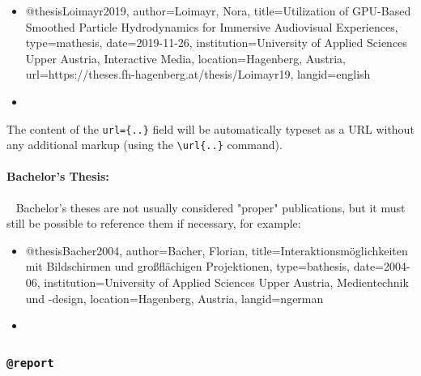 %
\begin{itemize}
\item[]
\begin{GenericCode}[numbers=none]
@thesis{Loimayr2019,
  author={Loimayr, Nora},
  title={Utilization of GPU-Based Smoothed Particle Hydrodynamics for Immersive Audiovisual Experiences},
  type={mathesis},
  date={2019-11-26},
  institution={University of Applied Sciences Upper Austria, Interactive Media},
  location={Hagenberg, Austria},
  url={https://theses.fh-hagenberg.at/thesis/Loimayr19},
  langid={english}
}
\end{GenericCode}
\item[\cite{Loimayr2019}] 
\end{itemize}
%
The content of the \verb!url={..}! field will be automatically typeset as a URL
without any additional markup (using the \verb!\url{..}! command).


\paragraph{Bachelor's Thesis:} ~ \newline
Bachelor's theses are not usually considered "proper" publications, but it must
still be possible to reference them if necessary, for example:
%
\begin{itemize}
\item[]
\begin{GenericCode}[numbers=none]
@thesis{Bacher2004,
  author={Bacher, Florian},
  title={Interaktionsmöglichkeiten mit Bildschirmen und großflächigen Projektionen},
  type={bathesis},
  date={2004-06},
  institution={University of Applied Sciences Upper Austria, Medientechnik und {-design}},
  location={Hagenberg, Austria},
  langid={ngerman}
}
\end{GenericCode}
\item[\cite{Bacher2004}] 
\end{itemize}


\subsubsection{\texttt{\bfseries @report}}
\label{sec:@report}

